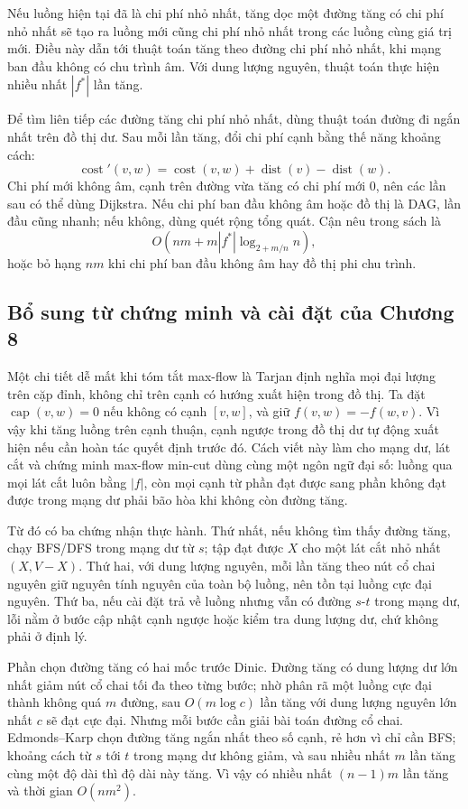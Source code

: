 \documentclass[11pt]{article}
\begin{document}
Nếu luồng hiện tại đã là chi phí nhỏ nhất, tăng dọc một đường tăng có chi phí
nhỏ nhất sẽ tạo ra luồng mới cũng chi phí nhỏ nhất trong các luồng cùng giá trị
mới. Điều này dẫn tới thuật toán tăng theo đường chi phí nhỏ nhất, khi mạng ban
đầu không có chu trình âm. Với dung lượng nguyên, thuật toán thực hiện nhiều
nhất \(|f^*|\) lần tăng.

Để tìm liên tiếp các đường tăng chi phí nhỏ nhất, dùng thuật toán đường đi ngắn
nhất trên đồ thị dư. Sau mỗi lần tăng, đổi chi phí cạnh bằng thế năng khoảng cách:
\[
  \operatorname{cost}'(v,w)=
  \operatorname{cost}(v,w)+\operatorname{dist}(v)-\operatorname{dist}(w).
\]
Chi phí mới không âm, cạnh trên đường vừa tăng có chi phí mới \(0\), nên các
lần sau có thể dùng Dijkstra. Nếu chi phí ban đầu không âm hoặc đồ thị là DAG,
lần đầu cũng nhanh; nếu không, dùng quét rộng tổng quát. Cận nêu trong sách là
\[
  O(nm + m|f^*|\log_{2+m/n} n),
\]
hoặc bỏ hạng \(nm\) khi chi phí ban đầu không âm hay đồ thị phi chu trình.

\subsection*{Bổ sung từ chứng minh và cài đặt của Chương 8}

Một chi tiết dễ mất khi tóm tắt max-flow là Tarjan định nghĩa mọi đại lượng trên
cặp đỉnh, không chỉ trên cạnh có hướng xuất hiện trong đồ thị. Ta đặt
\(\operatorname{cap}(v,w)=0\) nếu không có cạnh \([v,w]\), và giữ
\(f(v,w)=-f(w,v)\). Vì vậy khi tăng luồng trên cạnh thuận, cạnh ngược trong đồ thị
dư tự động xuất hiện nếu cần hoàn tác quyết định trước đó. Cách viết này làm cho
mạng dư, lát cắt và chứng minh max-flow min-cut dùng cùng một ngôn ngữ đại số:
luồng qua mọi lát cắt luôn bằng \(|f|\), còn mọi cạnh từ phần đạt được sang phần
không đạt được trong mạng dư phải bão hòa khi không còn đường tăng.

Từ đó có ba chứng nhận thực hành. Thứ nhất, nếu không tìm thấy đường tăng, chạy
BFS/DFS trong mạng dư từ \(s\); tập đạt được \(X\) cho một lát cắt nhỏ nhất
\((X,V-X)\). Thứ hai, với dung lượng nguyên, mỗi lần tăng theo nút cổ chai nguyên
giữ nguyên tính nguyên của toàn bộ luồng, nên tồn tại luồng cực đại nguyên. Thứ
ba, nếu cài đặt trả về luồng nhưng vẫn có đường \(s\)-\(t\) trong mạng dư, lỗi nằm
ở bước cập nhật cạnh ngược hoặc kiểm tra dung lượng dư, chứ không phải ở định lý.

Phần chọn đường tăng có hai mốc trước Dinic. Đường tăng có dung lượng dư lớn
nhất giảm nút cổ chai tối đa theo từng bước; nhờ phân rã một luồng cực đại thành
không quá \(m\) đường, sau \(O(m\log c)\) lần tăng với dung lượng nguyên lớn nhất
\(c\) sẽ đạt cực đại. Nhưng mỗi bước cần giải bài toán đường cổ chai. Edmonds--Karp
chọn đường tăng ngắn nhất theo số cạnh, rẻ hơn vì chỉ cần BFS; khoảng cách từ
\(s\) tới \(t\) trong mạng dư không giảm, và sau nhiều nhất \(m\) lần tăng cùng
một độ dài thì độ dài này tăng. Vì vậy có nhiều nhất \((n-1)m\) lần tăng và thời
gian \(O(nm^2)\).
\end{document}
